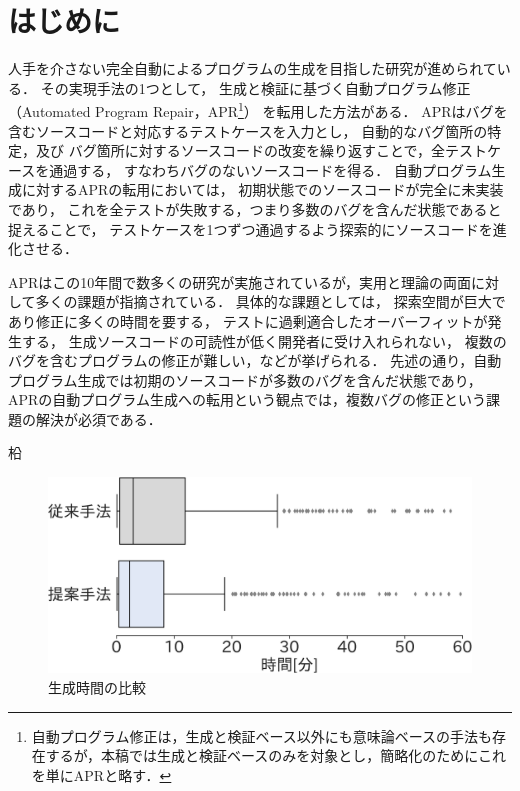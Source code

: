 \documentclass{ltjsarticle}
\begin{document}
\newcommand{\apr}{APR}
\newcommand{\apg}{自動プログラム生成}


\section{はじめに}


人手を介さない完全自動によるプログラムの生成を目指した研究が進められている\cite{desai2016program}\cite{zhang2013automatically}．
その実現手法の1つとして，
生成と検証に基づく自動プログラム修正\cite{wen2018context}
（Automated Program Repair，\apr\footnote{自動プログラム修正は，生成と検証ベース以外にも意味論ベースの手法も存在するが，本稿では生成と検証ベースのみを対象とし，簡略化のためにこれを単にAPRと略す．}）
を転用した方法がある\cite{tomid2020}．
\apr はバグを含むソースコードと対応するテストケースを入力とし，
自動的なバグ箇所の特定\cite{wong2016survey}，及び
バグ箇所に対するソースコードの改変を繰り返すことで，全テストケースを通過する，
すなわちバグのないソースコードを得る．
\apg に対する\apr の転用\cite{tomid2020}においては，
初期状態でのソースコードが完全に未実装であり，
これを全テストが失敗する，つまり多数のバグを含んだ状態であると捉えることで，
テストケースを1つずつ通過するよう探索的にソースコードを進化させる．


\apr はこの10年間で数多くの研究が実施されている\cite{gazzola2017automatic}が，実用と理論の両面に対して多くの課題が指摘されている．
具体的な課題としては，
探索空間が巨大であり修正に多くの時間を要する\cite{long2016analysis}，
テストに過剰適合したオーバーフィットが発生する\cite{smith2015cure}，
生成ソースコードの可読性が低く開発者に受け入れられない\cite{qi2015analysis}，
複数のバグを含むプログラムの修正が難しい\cite{saha2019harnessing}，などが挙げられる．
先述の通り，\apg では初期のソースコードが多数のバグを含んだ状態であり，
\apr の\apg への転用という観点では，複数バグの修正という課題の解決が必須である．

柗

\begin{figure}[b!]
  \centering
  \includegraphics[width=.5\linewidth]{fig-boxp.pdf}
  \caption{生成時間の比較}
  \label{fig:time_all}
\end{figure}




\end{document}
